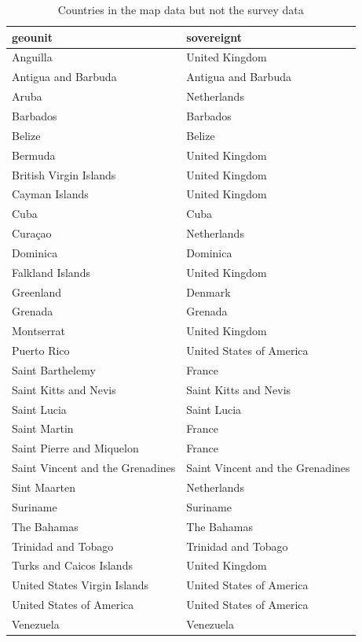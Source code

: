 \documentclass[
]{krantz}
\begin{document}
\begin{longtable}{ll}
\caption{\label{tab:ambarom-map-merge-check-2-tab}Countries in the map data but not the survey data}\\
\toprule
geounit & sovereignt \\ 
\midrule
Anguilla & United Kingdom \\ 
Antigua and Barbuda & Antigua and Barbuda \\ 
Aruba & Netherlands \\ 
Barbados & Barbados \\ 
Belize & Belize \\ 
Bermuda & United Kingdom \\ 
British Virgin Islands & United Kingdom \\ 
Cayman Islands & United Kingdom \\ 
Cuba & Cuba \\ 
Curaçao & Netherlands \\ 
Dominica & Dominica \\ 
Falkland Islands & United Kingdom \\ 
Greenland & Denmark \\ 
Grenada & Grenada \\ 
Montserrat & United Kingdom \\ 
Puerto Rico & United States of America \\ 
Saint Barthelemy & France \\ 
Saint Kitts and Nevis & Saint Kitts and Nevis \\ 
Saint Lucia & Saint Lucia \\ 
Saint Martin & France \\ 
Saint Pierre and Miquelon & France \\ 
Saint Vincent and the Grenadines & Saint Vincent and the Grenadines \\ 
Sint Maarten & Netherlands \\ 
Suriname & Suriname \\ 
The Bahamas & The Bahamas \\ 
Trinidad and Tobago & Trinidad and Tobago \\ 
Turks and Caicos Islands & United Kingdom \\ 
United States Virgin Islands & United States of America \\ 
United States of America & United States of America \\ 
Venezuela & Venezuela \\ 
\bottomrule
\end{longtable}
\end{document}

